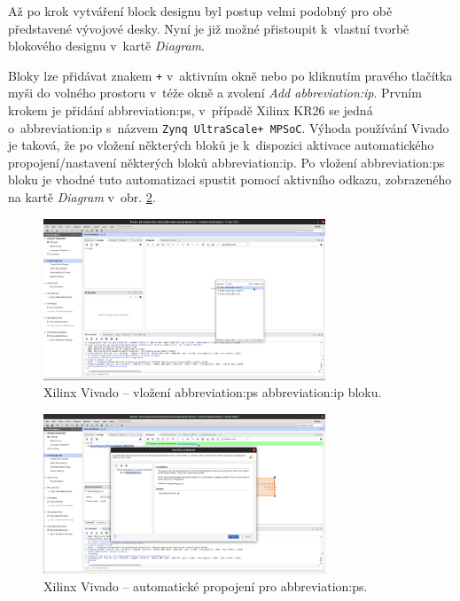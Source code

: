 \documentclass[a4paper, twoside, 11pt]{article}
\begin{document}
				Až po krok vytváření block designu byl postup velmi podobný pro obě představené vývojové desky. Nyní je již možné přistoupit k~vlastní tvorbě blokového designu v~kartě \textit{Diagram}.\par
				Bloky lze přidávat znakem \texttt{+} v~aktivním okně nebo po kliknutím pravého tlačítka myši do volného prostoru v~téže okně a zvolení \textit{Add \gls{abbreviation:ip}}. Prvním krokem je přidání \gls{abbreviation:ps}, v~případě Xilinx KR26 se jedná o~\gls{abbreviation:ip} s~názvem \texttt{Zynq UltraScale+ MPSoC}. Výhoda používání Vivado je taková, že po vložení některých bloků je k~dispozici aktivace automatického propojení/nastavení některých bloků \gls{abbreviation:ip}. Po vložení \gls{abbreviation:ps} bloku je vhodné tuto automatizaci spustit pomocí aktivního odkazu, zobrazeného na kartě \textit{Diagram} v~obr. \ref{fig:kr26-xilix-vivado-flow-05}.

				\begin{figure}[htbp!]
					\centering
					\includegraphics[width=0.75\textwidth]{src/png/kr26-xilinx-vivado-flow/kr26-xilix-vivado-flow-04.jpg}
					\caption{Xilinx Vivado – vložení \gls{abbreviation:ps} \gls{abbreviation:ip} bloku.}
					\label{fig:kr26-xilix-vivado-flow-04}
				\end{figure}

				\begin{figure}[htbp!]
					\centering
					\includegraphics[width=0.75\textwidth]{src/png/kr26-xilinx-vivado-flow/kr26-xilix-vivado-flow-05.jpg}
					\caption{Xilinx Vivado – automatické propojení pro \gls{abbreviation:ps}.}
					\label{fig:kr26-xilix-vivado-flow-05}
				\end{figure}
\end{document}
